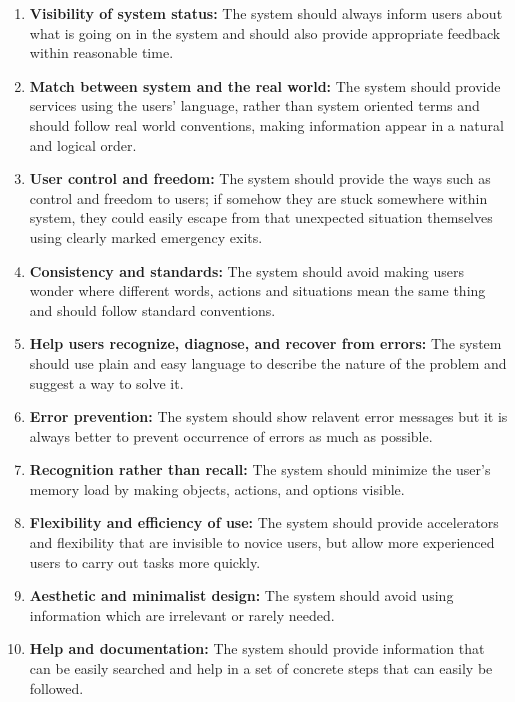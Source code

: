 \begin{enumerate}
\item \textbf{Visibility of system status:} The system should always inform
users about what is going on in the system and should also provide appropriate
feedback within reasonable time.
\item \textbf{Match between system and the real world:} The system should
provide services using the users' language, rather than system oriented terms
and should follow real world conventions, making information appear in a natural
and logical order.
\item \textbf{User control and freedom:} The system should provide the ways such
as control and freedom to users; if somehow they are stuck somewhere within
system, they could easily escape from that unexpected situation themselves 
using clearly marked emergency exits.
\item \textbf{Consistency and standards:} The system should avoid making users
wonder where different words, actions and situations  mean the same thing and
should follow standard  conventions.
\item \textbf{Help users recognize, diagnose, and recover from errors:} The
system should use plain and easy  language to describe the nature of the problem
and suggest a way to solve it.
\item \textbf{Error prevention:} The system should show relavent error messages
but it is always better to prevent occurrence of errors as much as possible.

\item \textbf{Recognition rather than recall:} The system should minimize the
user's memory load by making objects, actions, and options visible.
\item  \textbf{Flexibility and efficiency of use:} The system should provide
accelerators and flexibility that are invisible to novice users, but allow more
experienced users to carry out tasks more quickly.
\item \textbf{Aesthetic and minimalist design:} The system should avoid using
information which are irrelevant or rarely needed.
\item \textbf{Help and documentation:} The system should provide information
that can be easily searched and help in a set of concrete steps that can easily
be followed.
\end{enumerate}

